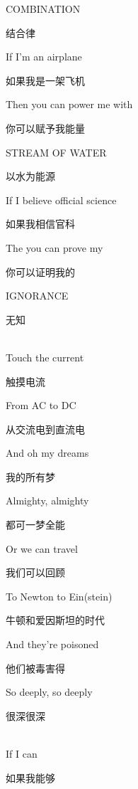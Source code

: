 \documentclass[UTF8,12pt,oneside]{ctexbook}
\begin{document}
\begin{center}
            COMBINATION
            
            结合律
            
            If I’m an airplane
            
            如果我是一架飞机
            
            Then you can power me with
            
            你可以赋予我能量
            
            STREAM OF WATER
            
            以水为能源
            
            If I believe official science
            
            如果我相信官科
            
            The you can prove my
            
            你可以证明我的
            
            IGNORANCE
            
            无知

            ~\\
            Touch the current
            
            触摸电流
            
            From AC to DC
            
            从交流电到直流电
            
            And oh my dreams
            
            我的所有梦
            
            Almighty, almighty
            
            都可一梦全能
            
            Or we can travel
            
            我们可以回顾
            
            To Newton to Ein(stein)
            
            牛顿和爱因斯坦的时代
            
            And they’re poisoned
            
            他们被毒害得
            
            So deeply, so deeply
            
            很深很深

            ~\\
            If I can
            
            如果我能够
            

\end{center}
\end{document}
